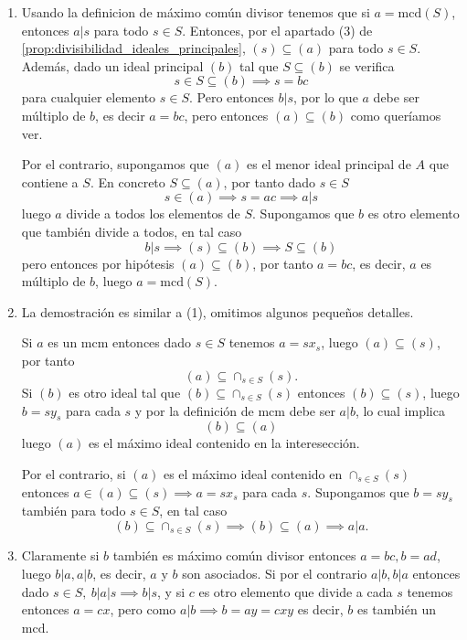 \begin{proofbox}

\begin{enumerate}
\item Usando la definicion de máximo común divisor tenemos que si \(a = \mathrm{mcd}(S)\), entonces $a | s$ para todo $s\in S$. Entonces, por el apartado (3) de \ref{prop:divisibilidad_ideales_principales}, \((s) \subseteq (a)\) para todo \(s \in S\). Además, dado un ideal principal $(b)$ tal que $S \subseteq (b)$ se verifica
\[
s \in S \subseteq (b) \implies s = bc
\]
para cualquier elemento $s \in S$. Pero entonces $b | s$, por lo que $a$ debe ser múltiplo de $b$, es decir $a = bc$, pero entonces $(a) \subseteq (b)$ como queríamos ver.

Por el contrario, supongamos que \((a)\) es el menor ideal principal de \(A\) que contiene a \(S\). En concreto $S \subseteq (a)$, por tanto dado $s \in S$
\[
s \in (a) \implies s = ac \implies a | s
\]
luego $a$ divide a todos los elementos de $S$. Supongamos que $b$ es otro elemento que también divide a todos, en tal caso 
\[
b | s \implies (s) \subseteq (b) \implies S \subseteq (b)
\]
pero entonces por hipótesis $(a) \subseteq (b)$, por tanto $a = bc$, es decir, $a$ es múltiplo de $b$, luego $a = \mathrm{mcd}(S)$.

\item La demostración es similar a (1), omitimos algunos pequeños detalles.

Si $a$ es un $\text{mcm}$ entonces dado $s \in S$ tenemos $a = sx_s$, luego $(a) \subseteq (s)$, por tanto
\[
(a) \subseteq \cap_{s \in S} (s).
\]
Si $(b)$ es otro ideal tal que $(b) \subseteq \cap_{s \in S} (s)$ entonces $(b) \subseteq (s)$, luego $b = sy_s$ para cada $s$ y por la definición de $\text{mcm}$ debe ser $a | b$, lo cual implica
\[
(b) \subseteq (a)
\]
luego $(a)$ es el máximo ideal contenido en la interesección.

Por el contrario, si $(a)$ es el máximo ideal contenido en $\cap_{s \in S} (s)$ entonces $a \in (a) \subseteq (s) \implies a = sx_s$ para cada $s$. Supongamos que $b = sy_s$ también para todo $s \in S$, en tal caso
\[
(b) \subseteq \cap_{s \in S} (s) \implies (b) \subseteq (a) \implies a | a.
\] 

\item Claramente si $b$ también es máximo común divisor entonces $a = bc, b = ad$, luego $b | a, a | b$, es decir, $a$ y $b$ son asociados. Si por el contrario $a | b, b | a$ entonces dado $s \in S,\ b | a | s \implies b | s$, y si $c$ es otro elemento que divide a cada $s$ tenemos entonces $a = cx$, pero como $a | b \implies b = ay = cxy$ es decir, $b$ es también un $\text{mcd}$.


\end{enumerate}
\end{proofbox}
